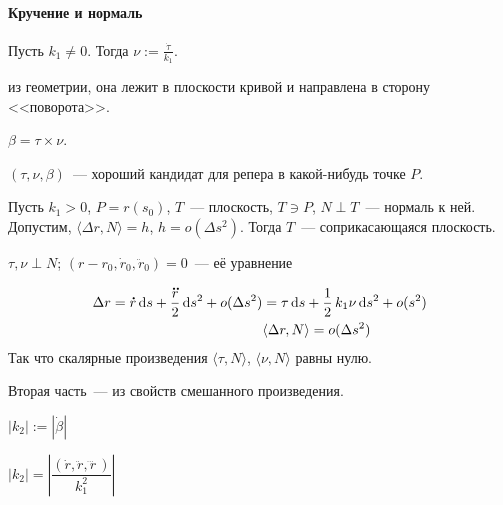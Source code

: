 \documentclass[draft,timbord]{longnotes}
\begin{document}
\paragraph{Кручение и нормаль}
\label{par:dg::norm}

\begin{defn}[Нормаль]\label{defn:dg::norm::norm}
  Пусть $k_1 \neq 0$. Тогда $\nu  := \frac{\dot \tau } {k_1}$.
\end{defn}
из геометрии, она лежит в плоскости кривой и направлена в сторону <<поворота>>. 
\begin{defn}[Бинормаль]\label{defn:dg::norm::binorm}
  $\beta = \tau \times \nu $.
\end{defn}

\begin{rem*}
  $(\tau,\nu,\beta)$~--- хороший кандидат для репера в какой-нибудь точке $P$.
\end{rem*}
\begin{defn}\label{defn:dg::norm::tangpl}
  Пусть $k_1 > 0$, $P = r(s_0)$, $T$~--- плоскость, $T \ni P$, $N \perp T$~--- нормаль к ней.
  Допустим, $ \langle \Delta r, N \rangle = h$, $h = o(\Delta s^2)$. Тогда $T$~--- соприкасающаяся
  плоскость.
\end{defn}
\begin{prop}\label{prop:dg::norm::tangpl}
  $ \tau , \nu \perp N  $;
  $(r-r_0, \dot r_0 , \ddot r_0)=0$~--- её уравнение
\end{prop}
\begin{lproof}
  \[
    \begin{split}
      \Delta r = \accentset{\mbox{\bfseries .}}{r}  \, \mathrm{d} s + \frac{\accentset{\mbox{\bfseries .\hspace{-0.1ex}.}}{r}}{2} \, \mathrm{d} s^2 + o(\Delta s^2)
      &= \tau \, \mathrm{d} s + \frac{1}{2} \, k_1 \nu \, \mathrm{d} s^2 + o(s^2) \\
      &\langle \Delta r , N \rangle = o(\Delta s^2) 
    \end{split}
  \]
  Так что скалярные произведения $\langle \tau,  N\rangle$, $\langle \nu,  N\rangle$ равны нулю.
  
  Вторая часть~--- из свойств смешанного произведения.
\end{lproof}

\begin{defn}\label{defn:dg::norm::abscrvn}
  $|k_2| := | \dot\beta|$
\end{defn}
\begin{thrm}\label{thrm:dg::norm::abscrvn}
  $|k_2| = \left|\dfrac{(\dot r, \ddot r, \dddot r\,)}{k_1^2}\right|$
\end{thrm}
\end{document}
